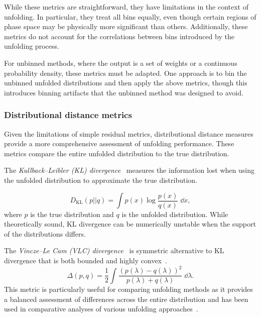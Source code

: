             While these metrics are straightforward, they have limitations in the context of unfolding.
            In particular, they treat all bins equally, even though certain regions of phase space may be physically more significant than others.
            Additionally, these metrics do not account for the correlations between bins introduced by the unfolding process.
            
            For unbinned methods, where the output is a set of weights or a continuous probability density, these metrics must be adapted.
            One approach is to bin the unbinned unfolded distributions and then apply the above metrics, though this introduces binning artifacts that the unbinned method was designed to avoid.

        \subsubsection{Distributional distance metrics}
        \label{subsubsec:distributional-distance-metrics}
            Given the limitations of simple residual metrics, distributional distance measures provide a more comprehensive assessment of unfolding performance.
            These metrics compare the entire unfolded distribution to the true distribution.

            The \emph{Kullback--Leibler (KL) divergence}~\cite{kullback_information_1951} measures the information lost when using the unfolded distribution to approximate the true distribution.
            
            \begin{equation}
            D_{\text{KL}}(p||q) = \int p(x) \log \frac{p(x)}{q(x)} \;\dd x,
            \end{equation}
            where \(p\) is the true distribution and
            \(q\) is the unfolded distribution.
            While theoretically sound, KL divergence can be numerically unstable when the support of the distributions differs.
            
            The \emph{Vincze--Le Cam (VLC) divergence}~\cite{vincze_concept_1981,Cam1986AsymptoticTheory} is symmetric alternative to KL divergence that is both bounded and highly convex~\cite{melbourne_strongly_2020}.
            \begin{equation}
                \Delta(p, q) = \frac{1}{2}\int \frac{(p(\lambda) - q(\lambda))^2}{p(\lambda) + q(\lambda)} \;\dd\lambda.
            \end{equation}
            This metric is particularly useful for comparing unfolding methods as it provides a balanced assessment of differences across the entire distribution and has been used in comparative analyses of various unfolding approaches~\cite{andreassen_omnifold_2020, komiske_preserving_2021}.

